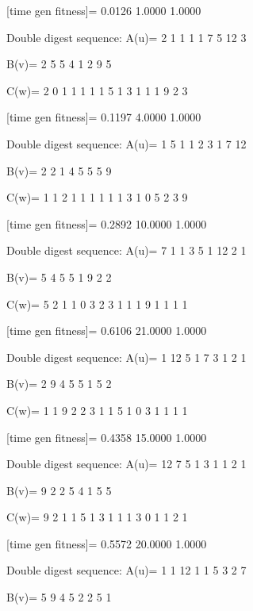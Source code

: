 [time gen fitness]=
    0.0126    1.0000    1.0000

Double digest sequence:
A(u)=
     2     1     1     1     1     7     5    12     3

B(v)=
     2     5     5     4     1     2     9     5

C(w)=
     2     0     1     1     1     1     1     5     1     3     1     1     1     9     2     3

[time gen fitness]=
    0.1197    4.0000    1.0000

Double digest sequence:
A(u)=
     1     5     1     1     2     3     1     7    12

B(v)=
     2     2     1     4     5     5     5     9

C(w)=
     1     1     2     1     1     1     1     1     1     3     1     0     5     2     3     9

[time gen fitness]=
    0.2892   10.0000    1.0000

Double digest sequence:
A(u)=
     7     1     1     3     5     1    12     2     1

B(v)=
     5     4     5     5     1     9     2     2

C(w)=
     5     2     1     1     0     3     2     3     1     1     1     9     1     1     1     1

[time gen fitness]=
    0.6106   21.0000    1.0000

Double digest sequence:
A(u)=
     1    12     5     1     7     3     1     2     1

B(v)=
     2     9     4     5     5     1     5     2

C(w)=
     1     1     9     2     2     3     1     1     5     1     0     3     1     1     1     1

[time gen fitness]=
    0.4358   15.0000    1.0000

Double digest sequence:
A(u)=
    12     7     5     1     3     1     1     2     1

B(v)=
     9     2     2     5     4     1     5     5

C(w)=
     9     2     1     1     5     1     3     1     1     1     3     0     1     1     2     1

[time gen fitness]=
    0.5572   20.0000    1.0000

Double digest sequence:
A(u)=
     1     1    12     1     1     5     3     2     7

B(v)=
     5     9     4     5     2     2     5     1

